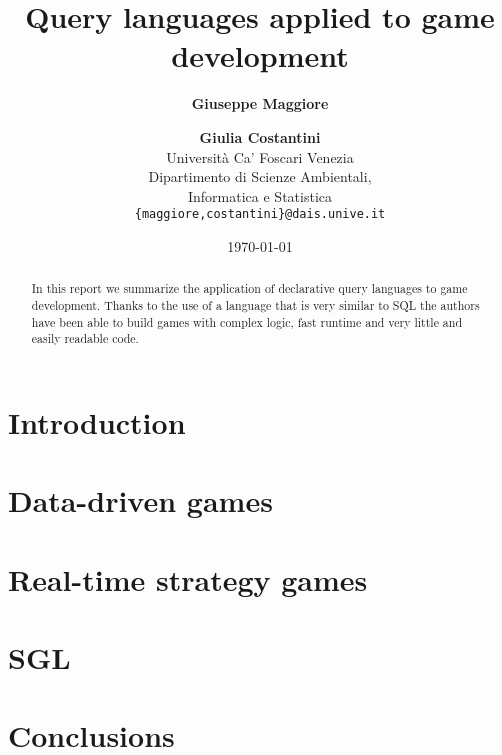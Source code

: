 \documentclass{article}
\begin{document}
\title{Query languages applied to game development}

\author{
\textbf{Giuseppe Maggiore} \and \textbf{Giulia Costantini} \\
       Universit\`a Ca' Foscari Venezia\\
       Dipartimento di Scienze Ambientali,\\
       Informatica e Statistica\\
       \texttt{\{maggiore,costantini\}@dais.unive.it}
}

\date{\today}
\maketitle

\begin{abstract}
In this report we summarize the application of declarative query languages to game development. Thanks to the use of a language that is very similar to SQL the authors have been able to build games with complex logic, fast runtime and very little and easily readable code.
\end{abstract}

\section{Introduction}
\label{sec:intro}
 

\section{Data-driven games}
\label{sec:ddg}


\section{Real-time strategy games}
\label{sec:rts}


\section{SGL}
\label{sec:sgl}


\section{Conclusions}
\label{sec:conclusions}



 

\nocite{}
\end{document}
